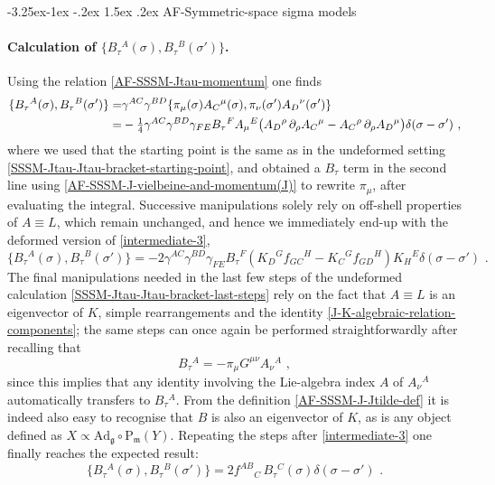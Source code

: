 \documentclass[12pt]{article}
\makeatletter
\renewcommand\subsection{\@startsection{subsection}{2}{\z@}%
                                     {-3.25ex\@plus -1ex \@minus -.2ex}%
                                     {1.5ex \@plus .2ex}%
                                     {\normalfont\bfseries}}
\numberwithin{equation}{section}
\makeatother
\begin{document}
\subsection{AF-Symmetric-space sigma models}\label{appendix:C-AFSSSM}
\paragraph{Calculation of $\{ B_{\tau}{}^{A}(\sigma),B_{\tau}{}^{B}(\sigma') \}$.} Using the relation \eqref{AF-SSSM-Jtau-momentum} one finds
\begin{align}
\{ B_{\tau}{}^{A}(\sigma),B_{\tau}{}^{B}(\sigma') \} =& \gamma^{AC}\gamma^{BD}\{ \pi_{\mu}(\sigma)A_{C}{}^{\mu}(\sigma),\pi_{\nu}(\sigma')A_{D}{}^{\nu}(\sigma') \} 
\\
=& -\tfrac{1}{4}\gamma^{AC}\gamma^{BD} \gamma_{FE}B_{\tau}{}^{F}A_{\mu}{}^{E}\bigl(A_{D}{}^{\rho}\, \partial_{\rho}A_{C}{}^{\mu}-A_{C}{}^{\rho}\, \partial_{\rho}A_{D}{}^{\mu}\bigr)\delta(\sigma-\sigma') \,\, ,
\notag 
\end{align}
where we used that the starting point is the same as in the undeformed setting \eqref{SSSM-Jtau-Jtau-bracket-starting-point}, and obtained a $B_{\tau}$ term in the second line using \eqref{AF-SSSM-J-vielbeine-and-momentum(J)} to rewrite $\pi_{\mu}$, after evaluating the integral. Successive manipulations solely rely on off-shell properties of $A\equiv L$, which remain unchanged, and hence we immediately end-up with the deformed version of \eqref{intermediate-3},
\begin{equation}
\{ B_{\tau}{}^{A}(\sigma),B_{\tau}{}^{B}(\sigma') \}=-2 \gamma^{AC}\gamma^{BD}\gamma_{FE}B_{\tau}{}^{F}(K_{D}{}^{G}f_{GC}{}^{H}-K_{C}{}^{G}f_{GD}{}^{H})K_{H}{}^{E}\delta(\sigma-\sigma') \,\, .
\end{equation}
The final manipulations needed in the last few steps of the undeformed calculation \eqref{SSSM-Jtau-Jtau-bracket-last-steps} rely on the fact that $A\equiv L$ is an eigenvector of $K$, simple rearrangements and the identity \eqref{J-K-algebraic-relation-components}; the same steps can once again be performed straightforwardly after recalling that
\begin{equation}
B_{\tau}{}^{A}=-\pi_{\mu}G^{\mu\nu}A_{\nu}{}^{A} \,\, ,
\end{equation}
since this implies that any identity involving the Lie-algebra index $A$ of $A_{\nu}{}^{A}$ automatically transfers to $B_{\tau}{}^{A}$. From the definition \eqref{AF-SSSM-J-Jtilde-def} it is indeed also easy to recognise that $B$ is also an eigenvector of $K$, as is any object defined as $X\propto \mathrm{Ad}_{\mathfrak{g}}\circ \mathrm{P}_{\mathfrak{m}}(Y)$. Repeating the steps after \eqref{intermediate-3} one finally reaches the expected result:
\begin{equation}
\{ B_{\tau}{}^{A}(\sigma),B_{\tau}{}^{B}(\sigma') \} = 2f^{AB}{}_{C} \, B_{\tau}{}^{C}(\sigma)\delta(\sigma-\sigma') \,\, .
\end{equation}
\end{document}

